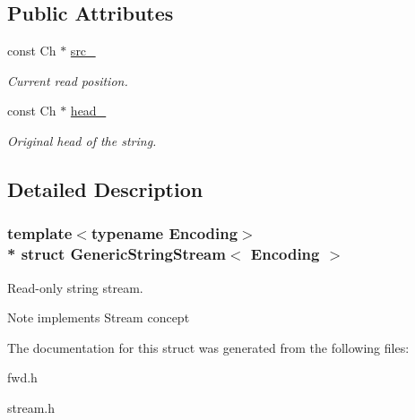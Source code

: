 \subsection*{Public Attributes}
\begin{DoxyCompactItemize}
\item 
const Ch $\ast$ \hyperlink{a00129_aeda813798e3f2d6bfdac86afc11b6b80}{src\+\_\+}\hypertarget{a00129_aeda813798e3f2d6bfdac86afc11b6b80}{}\label{a00129_aeda813798e3f2d6bfdac86afc11b6b80}

\begin{DoxyCompactList}\small\item\em Current read position. \end{DoxyCompactList}\item 
const Ch $\ast$ \hyperlink{a00129_a3c86ef1e1f0655028cb8a3afce11ee4f}{head\+\_\+}\hypertarget{a00129_a3c86ef1e1f0655028cb8a3afce11ee4f}{}\label{a00129_a3c86ef1e1f0655028cb8a3afce11ee4f}

\begin{DoxyCompactList}\small\item\em Original head of the string. \end{DoxyCompactList}\end{DoxyCompactItemize}


\subsection{Detailed Description}
\subsubsection*{template$<$typename Encoding$>$\\*
struct Generic\+String\+Stream$<$ Encoding $>$}

Read-\/only string stream. 

\begin{DoxyNote}{Note}
implements Stream concept 
\end{DoxyNote}


The documentation for this struct was generated from the following files\+:\begin{DoxyCompactItemize}
\item 
fwd.\+h\item 
stream.\+h\end{DoxyCompactItemize}
